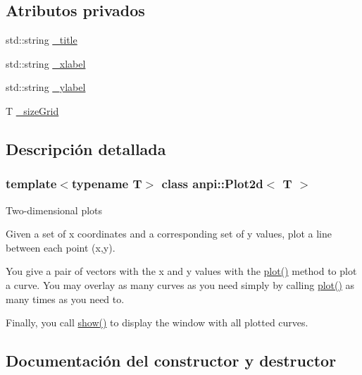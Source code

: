 \subsection*{Atributos privados}
\begin{DoxyCompactItemize}
\item 
std\+::string \hyperlink{classanpi_1_1Plot2d_a95db211aec89f0e66b28ad01ce74d2ae}{\+\_\+title}
\item 
std\+::string \hyperlink{classanpi_1_1Plot2d_a6537d8a33bb34a55a3e2c9e052eba10e}{\+\_\+xlabel}
\item 
std\+::string \hyperlink{classanpi_1_1Plot2d_a82ade43ab875298e8b84eceab8bf8a35}{\+\_\+ylabel}
\item 
T \hyperlink{classanpi_1_1Plot2d_a2730a5c9f7b2b120c897672209aa580e}{\+\_\+size\+Grid}
\end{DoxyCompactItemize}


\subsection{Descripción detallada}
\subsubsection*{template$<$typename T$>$\newline
class anpi\+::\+Plot2d$<$ T $>$}

Two-\/dimensional plots

Given a set of x coordinates and a corresponding set of y values, plot a line between each point (x,y).

You give a pair of vectors with the x and y values with the \hyperlink{classanpi_1_1Plot2d_a0b04dd4c40f9f623789fa688bd3c593d}{plot()} method to plot a curve. You may overlay as many curves as you need simply by calling \hyperlink{classanpi_1_1Plot2d_a0b04dd4c40f9f623789fa688bd3c593d}{plot()} as many times as you need to.

Finally, you call \hyperlink{classanpi_1_1Plot2d_a41165ac70edb258fa0fbcce04ddf7025}{show()} to display the window with all plotted curves. 

\subsection{Documentación del constructor y destructor}
\mbox{\label{classanpi_1_1Plot2d_a0d7d01999364a90882de6b19bdd0245b}} 
